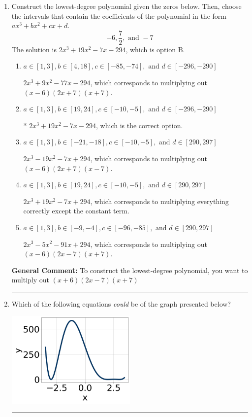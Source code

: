 \documentclass{extbook}[14pt]
\newcommand{\litem}[1]{\item #1

\rule{\textwidth}{0.4pt}}
\begin{document}
\begin{enumerate}\litem{
Construct the lowest-degree polynomial given the zeros below. Then, choose the intervals that contain the coefficients of the polynomial in the form $ax^3+bx^2+cx+d$.
\[ -6, \frac{7}{2}, \text{ and } -7 \]The solution is \( 2x^{3} +19 x^{2} -7 x -294 \), which is option B.\begin{enumerate}[label=\Alph*.]
\item \( a \in [1, 3], b \in [4, 18], c \in [-85, -74], \text{ and } d \in [-296, -290] \)

$2x^{3} +9 x^{2} -77 x -294$, which corresponds to multiplying out $(x -6)(2x + 7)(x + 7)$.
\item \( a \in [1, 3], b \in [19, 24], c \in [-10, -5], \text{ and } d \in [-296, -290] \)

* $2x^{3} +19 x^{2} -7 x -294$, which is the correct option.
\item \( a \in [1, 3], b \in [-21, -18], c \in [-10, -5], \text{ and } d \in [290, 297] \)

$2x^{3} -19 x^{2} -7 x + 294$, which corresponds to multiplying out $(x -6)(2x + 7)(x -7)$.
\item \( a \in [1, 3], b \in [19, 24], c \in [-10, -5], \text{ and } d \in [290, 297] \)

$2x^{3} +19 x^{2} -7 x + 294$, which corresponds to multiplying everything correctly except the constant term.
\item \( a \in [1, 3], b \in [-9, -4], c \in [-96, -85], \text{ and } d \in [290, 297] \)

$2x^{3} -5 x^{2} -91 x + 294$, which corresponds to multiplying out $(x -6)(2x -7)(x + 7)$.
\end{enumerate}

\textbf{General Comment:} To construct the lowest-degree polynomial, you want to multiply out $(x + 6)(2x -7)(x + 7)$
}
\litem{
Which of the following equations \textit{could} be of the graph presented below?

\begin{center}
    \includegraphics[width=0.5\textwidth]{../Figures/polyGraphToFunctionB.png}
\end{center}


}
\end{enumerate}
\end{document}
